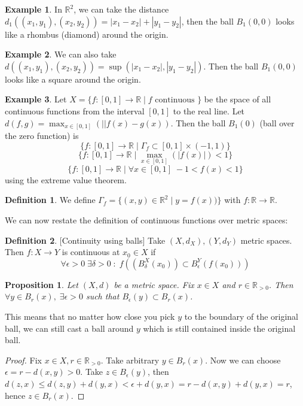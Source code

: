 \documentclass{article}
\theoremstyle{definition}
\newtheorem{defn}{Definition}[section]
\newtheorem{exmp}{Example}[section]
\theoremstyle{plain}%
\newtheorem{prop}[thm]{Proposition}
\theoremstyle{remark}
\newcommand{\R}{\mathbb{R}}
\begin{document}
\begin{exmp}
In $\R^2$, we can take the distance $d_1((x_1, y_1), (x_2, y_2)) = |x_1-x_2| + |y_1-y_2|$, then the ball $B_1(0,0)$ looks like a rhombus (diamond) around the origin.
\end{exmp}

\begin{exmp}
We can also take $d((x_1, y_1), (x_2, y_2)) = \sup(|x_1-x_2|, |y_1- y_2|)$. Then the ball $B_1(0,0)$ looks like a square around the origin.
\end{exmp}

\begin{exmp}
Let $X = \{f : [0,1] \to \R \; | \; f \text{ continuous }\}$ be the space of all continuous functions from the interval $[0,1]$ to the real line. Let $d(f,g) = \max_{x \in [0,1]}(||f(x) - g(x))$. Then the ball $B_1(0)$ (ball over the zero function) is \[\{f : [0,1] \to \R \; | \; \Gamma_f \subset [0,1] \times (-1, 1)\} \] \[ \{f : [0,1] \to \R \; | \; \max_{x \in [0,1]} (|f(x)|) < 1\} \] \[ \{f : [0,1] \to \R \; | \; \forall x \in [0,1] \; -1 < f(x) < 1\} \] using the extreme value theorem.
\end{exmp}

\begin{defn}
We define $\Gamma_f = \{(x,y) \in \R^2 \; | \; y = f(x))\}$ with $f : \R \to \R$.
\end{defn}

We can now restate the definition of continuous functions over metric spaces:

\begin{defn}\label{cont using balls defn}[Continuity using balls]
Take $(X, d_X), (Y, d_Y)$ metric spaces. Then $f: X \to Y$ is continuous at $x_0 \in X$ if \[\forall \epsilon >0 \; \exists \delta > 0 \; : \; f((B^X_{\delta} (x_0)) \subset B^Y_{\epsilon} (f(x_0)))\]
\end{defn}

\begin{prop}\label{open ball prop}
Let $(X, d)$ be a metric space. Fix $x \in X$ and $r \in \R_{> 0}$. Then $\forall y \in B_r(x), \; \exists \epsilon > 0$ such that $B_{\epsilon} (y) \subset B_r(x)$.
\end{prop}

This means that no matter how close you pick $y$ to the boundary of the original ball, we can still cast a ball around $y$ which is still contained inside the original ball.

\begin{proof}
Fix $x \in X, r \in \R_{> 0}$. Take arbitrary $y \in B_r(x)$. Now we can choose $\epsilon = r - d(x,y) > 0$. Take $z \in B_{\epsilon}(y)$, then $d(z,x) \le d(z,y) + d(y,x) < \epsilon + d(y,x) = r - d(x,y) + d(y,x) = r$, hence $z \in B_r(x)$.
\end{proof}
\end{document}
